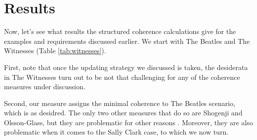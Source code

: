 \documentclass[10pt,]{scrartcl}
\begin{document}
\section{Results}\label{sec:Sally}

Now, let's see what results the structured coherence calculations give for the examples and requirements discussed earlier. We start with \textsf{The Beatles} and \textsf{The Witnesses} (Table \ref{tab:witnesses}).



\begin{table}
        \caption{Coherence scores for the Beatles and witness scenarios.}
    \label{tab:witnesses}
\end{table}


First, note that once the updating strategy we discussed is taken, the desiderata in \textsf{The Witnesses} turn out to be not that
challenging for any of the coherence measures under discussion.

Second,  our measure assigns the minimal coherence to \textsf{The Beatles} scenario, which is as desidred. The only two other measures that do so are Shogenji and Olsson-Glass, but they are problematic for other reasons  \citep{Merricks1995, Akiba2000Shogenjis, Shogenji2001Reply, Siebel2004On-Fitelsons-me,siebel2006against,Shogenji2006Why,koscholke2016evaluating, Schippers2019General}. Moreover, they are also problematic when it comes to the Sally Clark case, to which we now turn.
\end{document}
